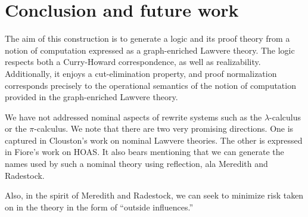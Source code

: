 \documentclass{llncs}
\renewcommand{\:}{\colon}
\newcommand{\pic}{$\pi$-calculus}
\begin{document}








  

\section{Conclusion and future work}

The aim of this construction is to generate a logic and its proof
theory from a notion of computation expressed as a graph-enriched
Lawvere theory. The logic respects both a Curry-Howard correspondence,
as well as realizability. Additionally, it enjoys a cut-elimination
property, and proof normalization corresponds precisely to the
operational semantics of the notion of computation provided in the
graph-enriched Lawvere theory.

We have not addressed nominal aspects of rewrite systems such as the
$\lambda$-calculus or the {\pic}. We note that there are two very
promising directions. One is captured in Clouston’s work on nominal
Lawvere theories. The other is expressed in Fiore’s work on HOAS. It
also bears mentioning that we can generate the names used by such a
nominal theory using reflection, ala Meredith and Radestock.

Also, in the spirit of Meredith and Radestock, we can seek to minimize
risk taken on in the theory in the form of “outside influences.”




\end{document}
